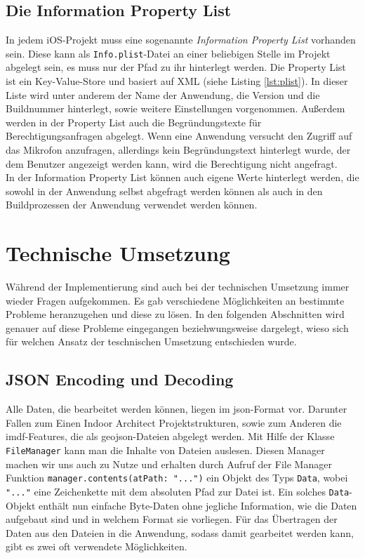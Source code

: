 \subsection{Die Information Property List}
In jedem iOS-Projekt muss eine sogenannte \textit{Information Property List} vorhanden sein.
Diese kann als \texttt{Info.plist}-Datei an einer beliebigen Stelle im Projekt abgelegt sein, es muss nur der Pfad zu ihr hinterlegt werden.
Die Property List ist ein Key-Value-Store und basiert auf XML (siehe Listing \ref{lst:plist}).
In dieser Liste wird unter anderem der Name der Anwendung, die Version und die Buildnummer hinterlegt, sowie weitere Einstellungen vorgenommen.
Außerdem werden in der Property List auch die Begründungstexte für Berechtigungsanfragen abgelegt.
Wenn eine Anwendung versucht den Zugriff auf das Mikrofon anzufragen, allerdings kein Begründungstext hinterlegt wurde, der dem Benutzer angezeigt werden kann, wird die Berechtigung nicht angefragt.
\\
In der Information Property List können auch eigene Werte hinterlegt werden, die sowohl in der Anwendung selbst abgefragt werden können als auch in den Buildprozessen der Anwendung verwendet werden können.

\section{Technische Umsetzung}
\label{sec:techimp}
Während der Implementierung sind auch bei der technischen Umsetzung immer wieder Fragen aufgekommen.
Es gab verschiedene Möglichkeiten an bestimmte Probleme heranzugehen und diese zu lösen.
In den folgenden Abschnitten wird genauer auf diese Probleme eingegangen beziehwungsweise dargelegt, wieso sich für welchen Ansatz der teschnischen Umsetzung entschieden wurde.
\subsection{JSON Encoding und Decoding}
\label{subsec:encodingdecoding}
Alle Daten, die bearbeitet werden können, liegen im \ac{json}-Format vor.
Darunter Fallen zum Einen Indoor Architect Projektstrukturen, sowie zum Anderen die \ac{imdf}-Features, die als \ac{geojson}-Dateien abgelegt werden.
Mit Hilfe der Klasse \texttt{FileManager} kann man die Inhalte von Dateien auslesen.
Diesen Manager machen wir uns auch zu Nutze und erhalten durch Aufruf der File Manager Funktion \texttt{manager.contents(atPath: "...")} ein Objekt des Typs \texttt{Data}, wobei \texttt{"..."} eine Zeichenkette mit dem absoluten Pfad zur Datei ist.
Ein solches \texttt{Data}-Objekt enthält nun einfache Byte-Daten ohne jegliche Information, wie die Daten aufgebaut sind und in welchem Format sie vorliegen.
Für das Übertragen der Daten aus den Dateien in die Anwendung, sodass damit gearbeitet werden kann, gibt es zwei oft verwendete Möglichkeiten.
